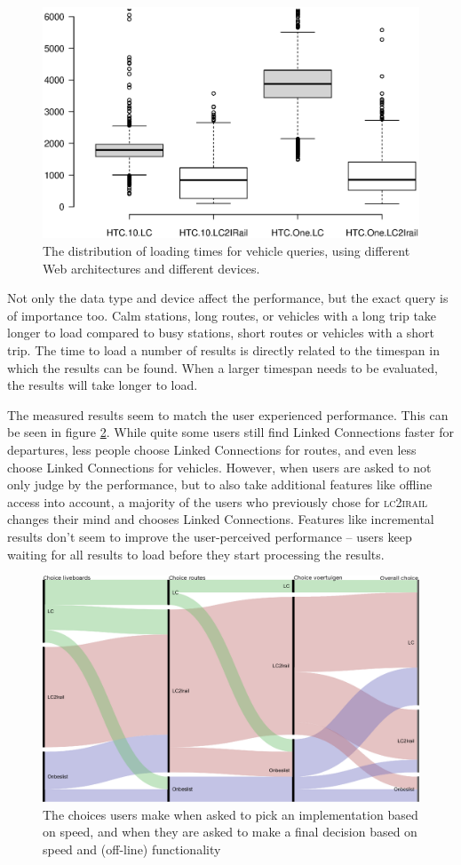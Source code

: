 \documentclass[twocolumn]{phdsymp} %
\begin{document}
\begin{figure}[ht]
	\begin{center}
		\includegraphics[trim=3cm 4cm 0 0, width=.50\textwidth]{images/boxplot_vehicles.eps}
		\caption{\label{fig:vehicle} The distribution of loading times for vehicle queries, using different Web architectures and different devices. }
	\end{center}
\end{figure}

Not only the data type and device affect the performance, but the exact query is of importance too. Calm stations, long routes, or vehicles with a long trip take longer to load compared to busy stations, short routes or vehicles with a short trip. The time to load a number of results is directly related to the timespan in which the results can be
found. When a larger timespan needs to be evaluated, the results will take longer to load.

The measured results seem to match the user experienced performance. This can be seen in figure \ref{fig:choices}. While quite some users still find Linked Connections faster for departures, less people choose Linked Connections for routes, and even less choose Linked Connections for vehicles. However, when users are asked to not only judge by the performance, but to also take additional features like offline access into account, a majority of the users who previously chose for \textsc{lc2irail} changes their mind and chooses Linked Connections. Features like incremental results don’t seem to improve the user-perceived performance – users keep waiting for all results to load before they start processing the results.

\begin{figure}[ht]
	\begin{center}
		\includegraphics[width=.40\textwidth]{images/alluvial_user_choice_en.eps}
		\caption{\label{fig:choices} The choices users make when asked to pick an implementation based on speed, and when they are asked to make a final decision based on speed and (off-line) functionality }
	\end{center}
\end{figure}
\end{document}
